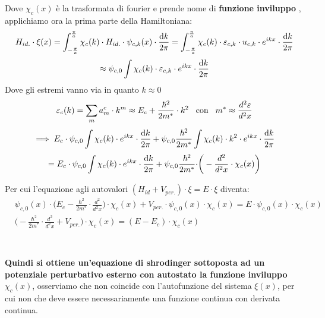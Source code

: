 Dove $\chi_c(x)$ è la trasformata di fourier e prende nome di \textbf{funzione inviluppo} , applichiamo ora la prima parte della Hamiltoniana:
\[H_{id.} \cdot \xi(x) = \int_{-\frac{\pi}{a}}^{\frac{\pi}{a}}\chi_c(k) \cdot H_{id.} \cdot \psi_{c,k}(x)\cdot \frac{\text{d}{k}}{2\pi}  = \int_{-\frac{\pi}{a}}^{\frac{\pi}{a}}\chi_c(k) \cdot \varepsilon_{c,k}\cdot u_{c,k}\cdot e^{ikx}\cdot \frac{\text{d}{k}}{2\pi} \]
\[\approx \psi_{c,0} \int \chi_c(k) \cdot \varepsilon_{c,k} \cdot e^{ikx}\cdot \frac{\text{d}{k}}{2\pi}  \]
Dove gli estremi vanno via in quanto $k\approx 0$
\[\varepsilon_c(k) = \sum_ma_m^c\cdot k^m \approx E_c + \frac{\hbar^2}{2m^*}\cdot k^2 \hspace{0.3cm} \text{con} \hspace{0.3cm} m^* \approx \frac{d^2\varepsilon}{d^2x} \]
\[\implies  E_c \cdot \psi_{c,0} \int \chi_c(k) \cdot e^{ikx}\cdot \frac{\text{d}{k}}{2\pi} + \psi_{c,0} \frac{\hbar^2}{2m^*}\int \chi_c(k) \cdot k^2 \cdot e^{ikx}\cdot \frac{\text{d}{k}}{2\pi}  \]
\[=E_c \cdot \psi_{c,0} \int \chi_c(k) \cdot e^{ikx}\cdot \frac{\text{d}{k}}{2\pi} + \psi_{c,0} \frac{\hbar^2}{2m^*} \cdot \biggr(-\frac{d^2}{d^2x}\cdot \chi_c(x)\biggr)\]
 
Per cui l'equazione agli autovalori $(H_{id}+V_{per.})\cdot \xi = E \cdot \xi$ diventa:\\
\begin{equation}
    \begin{split}
        &\psi_{c,0}(x)\cdot \biggr(E_c-\frac{\hbar^2}{2m^*}\cdot \frac{d^2}{d^2x}\biggr)\cdot \chi_c(x) + V_{per.}\cdot \psi_{c,0}(x) \cdot \chi_c(x) = E \cdot \psi_{c,0}(x) \cdot \chi_c(x)\\
        &\biggr(-\frac{\hbar^2}{2m^*}\cdot \frac{d^2}{d^2x}+V_{per.}\biggr)\cdot \chi_c(x) = (E-E_c)\cdot \chi_c(x)\\
    \end{split}
\end{equation}
\\\\
\textbf{Quindi si ottiene un'equazione di shrodinger sottoposta ad un potenziale perturbativo esterno con autostato la funzione inviluppo $\chi_c(x)$}, osserviamo che non coincide con l'autofunzione del sistema $\xi(x)$, per cui non che deve essere necessariamente una funzione continua con derivata continua.\\\\

